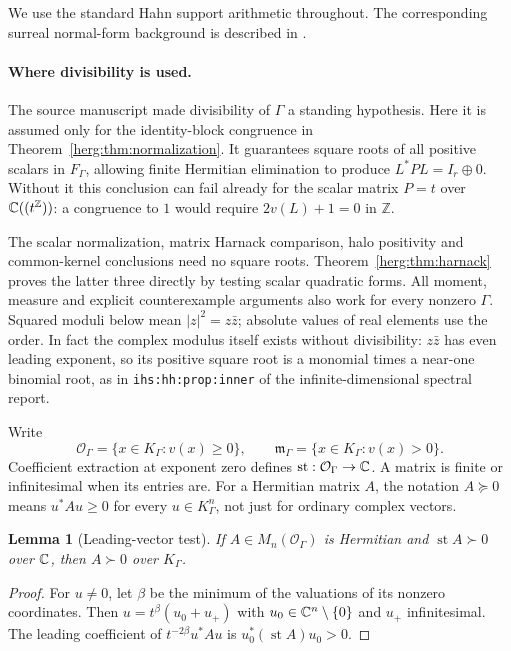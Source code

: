 \documentclass[11pt,letterpaper]{article}
\newtheorem{lemma}[theorem]{Lemma}
\theoremstyle{definition}
\newcommand{\Z}{\mathbb Z}\newcommand{\N}{\mathbb N}
\newcommand{\FG}{F_\Gamma}\newcommand{\KG}{K_\Gamma}
\newcommand{\st}{\operatorname{st}}
\newcommand{\lbl}[1]{\nolinkurl{#1}}%
\numberwithin{equation}{section}
\begin{document}
We use the standard Hahn support arithmetic throughout. The corresponding surreal normal-form background is described in \cite{Gonshor}.

\paragraph{Where divisibility is used.}
The source manuscript made divisibility of $\Gamma$ a standing hypothesis.
Here it is assumed only for the identity-block congruence in
Theorem~\ref{herg:thm:normalization}. It guarantees square roots of all
positive scalars in $\FG$, allowing finite Hermitian elimination to produce
$L^*PL=I_r\oplus0$. Without it this conclusion can fail already for the
scalar matrix $P=t$ over $\C((t^\Z))$: a congruence to $1$ would require
$2v(L)+1=0$ in $\Z$.

The scalar normalization, matrix Harnack comparison, halo positivity and
common-kernel conclusions need no square roots. Theorem~\ref{herg:thm:harnack}
proves the latter three directly by testing scalar quadratic forms.
All moment, measure and explicit counterexample arguments also work for
every nonzero $\Gamma$. Squared moduli below mean $|z|^2=z\bar z$; absolute
values of real elements use the order. In fact the complex modulus itself
exists without divisibility: $z\bar z$ has even leading exponent, so its
positive square root is a monomial times a near-one binomial root, as in
\lbl{ihs:hh:prop:inner} of the infinite-dimensional spectral report.

Write
\[
 \mathcal O_\Gamma=\{x\in\KG:v(x)\ge0\},\qquad
 \mathfrak m_\Gamma=\{x\in\KG:v(x)>0\}.
\]
Coefficient extraction at exponent zero defines $\st:\mathcal O_\Gamma\to\C$. A matrix is finite or infinitesimal when its entries are. For a Hermitian matrix $A$, the notation $A\succeq0$ means $u^*Au\ge0$ for every $u\in\KG^n$, not just for ordinary complex vectors.

\begin{lemma}[Leading-vector test]\label{herg:lem:leadingvector}
If $A\in M_n(\mathcal O_\Gamma)$ is Hermitian and $\st A\succ0$ over $\mathbb C$, then $A\succ0$ over $\KG$.
\end{lemma}
\begin{proof}
For $u\ne0$, let $\beta$ be the minimum of the valuations of its nonzero coordinates. Then $u=t^\beta(u_0+u_+)$ with $u_0\in\mathbb C^n\setminus\{0\}$ and $u_+$ infinitesimal. The leading coefficient of $t^{-2\beta}u^*Au$ is $u_0^*(\st A)u_0>0$.
\end{proof}
\end{document}
